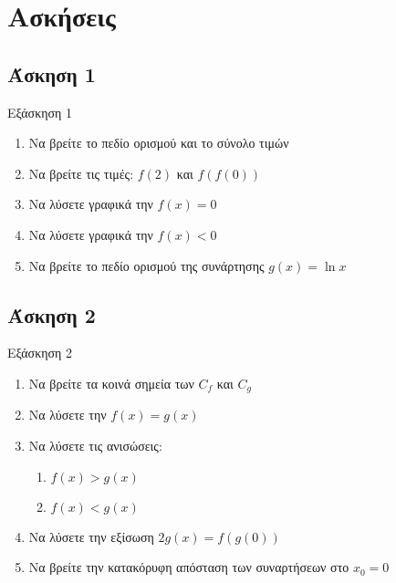 \documentclass[greek]{beamer}
\begin{document}
\section{Ασκήσεις}

\subsection{Άσκηση 1}
\begin{frame}[label=Άσκηση1,t]{Εξάσκηση 1}
      \href{https://www.geogebra.org/m/jmmx7bp8}{}
      \begin{enumerate}
            \item<1-> Να βρείτε το πεδίο ορισμού και το σύνολο τιμών
            \item Να βρείτε τις τιμές: $f(2)$ και $f(f(0))$
            \item<2-> Να λύσετε γραφικά την $f(x)=0$
            \item<3-> Να λύσετε γραφικά την $f(x)<0$
            \item<4-> Να βρείτε το πεδίο ορισμού της συνάρτησης $g(x)=\ln x$
      \end{enumerate}
\end{frame}

\subsection{Άσκηση 2}
\begin{frame}[label=Άσκηση2,t]{Εξάσκηση 2}
      \href{https://www.geogebra.org/m/td6m58hw}{}
      \begin{enumerate}
            \item<1-> Να βρείτε τα κοινά σημεία των $C_f$ και $C_g$
            \item<2-> Να λύσετε την $f(x)=g(x)$
            \item<3-> Να λύσετε τις ανισώσεις:
                  \begin{enumerate}
                        \item<4-> $f(x)>g(x)$
                        \item<5-> $f(x)<g(x)$
                  \end{enumerate}
            \item<6-> Να λύσετε την εξίσωση $2g(x)=f(g(0))$
            \item<7-> Να βρείτε την κατακόρυφη απόσταση των συναρτήσεων στο $x_0=0$
      \end{enumerate}
\end{frame}
\end{document}
